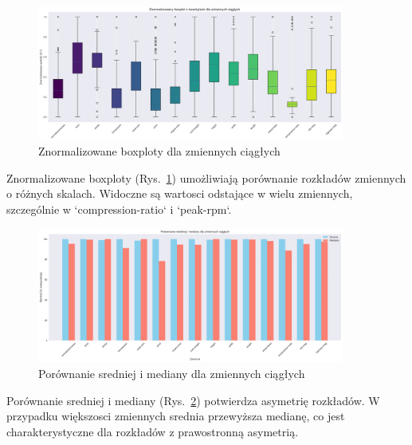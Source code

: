 \documentclass[12pt,a4paper]{article}
\begin{document}
\begin{figure}[H]
    \centering
    \includegraphics[width=0.9\textwidth]{figures/boxplots_znormalizowane.png}
    \caption{Znormalizowane boxploty dla zmiennych ciągłych}
    \label{fig:boxplots_znormalizowane}
\end{figure}

Znormalizowane boxploty (Rys.~\ref{fig:boxplots_znormalizowane}) umożliwiają porównanie rozkładów zmiennych o różnych skalach. Widoczne są wartosci odstające w wielu zmiennych, szczególnie w `compression-ratio` i `peak-rpm`.

\begin{figure}[H]
    \centering
    \includegraphics[width=0.9\textwidth]{figures/srednia_vs_mediana.png}
    \caption{Porównanie sredniej i mediany dla zmiennych ciągłych}
    \label{fig:srednia_vs_mediana}
\end{figure}

Porównanie sredniej i mediany (Rys.~\ref{fig:srednia_vs_mediana}) potwierdza asymetrię rozkładów. W przypadku większosci zmiennych srednia przewyższa medianę, co jest charakterystyczne dla rozkładów z prawostronną asymetrią.
\end{document}
